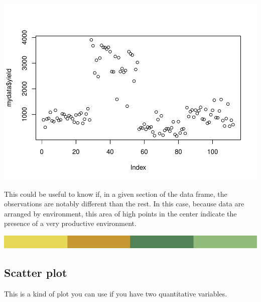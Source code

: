\documentclass[
]{book}
\newenvironment{Shaded}{\begin{snugshade}}{\end{snugshade}}
\newcommand{\AttributeTok}[1]{\textcolor[rgb]{0.77,0.63,0.00}{#1}}
\newcommand{\CommentTok}[1]{\textcolor[rgb]{0.56,0.35,0.01}{\textit{#1}}}
\newcommand{\FunctionTok}[1]{\textcolor[rgb]{0.00,0.00,0.00}{#1}}
\newcommand{\NormalTok}[1]{#1}
\newcommand{\OtherTok}[1]{\textcolor[rgb]{0.56,0.35,0.01}{#1}}
\newcommand{\SpecialCharTok}[1]{\textcolor[rgb]{0.00,0.00,0.00}{#1}}
\newcommand{\StringTok}[1]{\textcolor[rgb]{0.31,0.60,0.02}{#1}}
\begin{document}
\begin{Shaded}
\end{Shaded}

\includegraphics{PPB-Toolkit-for-R-and-R-Studio_files/figure-latex/unnamed-chunk-56-1.pdf}

This could be useful to know if, in a given section of the data frame, the observations are notably different than the rest. In this case, because data are arranged by environment, this area of high points in the center indicate the presence of a very productive environment.

\includegraphics{rsrstrip.png}

\hypertarget{scatter-plot}{%
\subsection{Scatter plot}\label{scatter-plot}}

This is a kind of plot you can use if you have two quantitative variables.

\begin{Shaded}
\end{Shaded}
\end{document}
